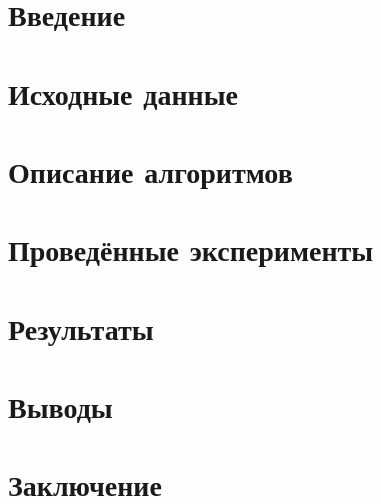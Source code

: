 \documentclass[main.tex]{subfiles}
\begin{document}
\section{Введение} \label{intro}

\section{Исходные данные} \label{input}

\section{Описание алгоритмов} \label{alg_desc}

\section{Проведённые эксперименты}\label{experiments}

\section{Результаты}

\section{Выводы}

\section{Заключение} %
	
\end{document}
